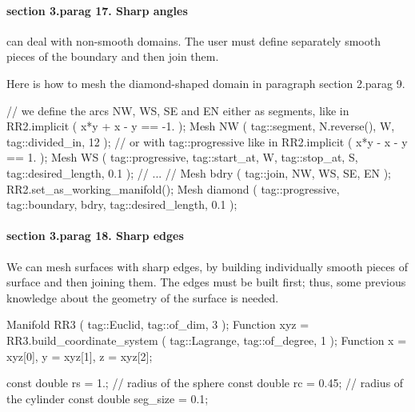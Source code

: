 \paragraph{\numb section 3.\numb parag 17. Sharp angles}

{\ManiFEM} can deal with non-smooth domains.
The user must define separately smooth pieces of the boundary and then join them.

Here is how to mesh the diamond-shaped domain in paragraph \numb section 2.\numb parag 9.

\verbatim
   // we define the arcs NW, WS, SE and EN either as segments, like in
   RR2.implicit ( x*y + x - y == -1. );
   Mesh NW ( tag::segment, N.reverse(), W, tag::divided_in, 12 );
   // or with tag::progressive like in
   RR2.implicit ( x*y - x - y ==  1. );
   Mesh WS ( tag::progressive, tag::start_at, W, tag::stop_at, S,
             tag::desired_length, 0.1 );
   // ... //
   Mesh bdry ( tag::join, NW, WS, SE, EN );
   RR2.set_as_working_manifold();
   Mesh diamond ( tag::progressive, tag::boundary, bdry, tag::desired_length, 0.1 );
\endverbatim





\paragraph{\numb section 3.\numb parag 18. Sharp edges}

We can mesh surfaces with sharp edges, by building individually smooth pieces of surface
and then {\codett join}ing them.
The edges must be built first;
thus, some previous knowledge about the geometry of the surface is needed.

\verbatim
   Manifold RR3 ( tag::Euclid, tag::of_dim, 3 );
   Function xyz = RR3.build_coordinate_system ( tag::Lagrange, tag::of_degree, 1 );
   Function x = xyz[0],  y = xyz[1],  z = xyz[2];

   const double rs = 1.;    // radius of the sphere
   const double rc = 0.45;  // radius of the cylinder
   const double seg_size = 0.1;

